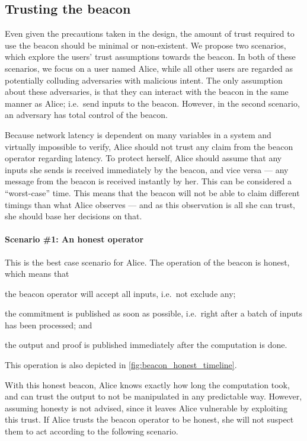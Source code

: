 \subsection{Trusting the beacon}%
\label{sub:trusting_the_beacon}

Even given the precautions taken in the design, the amount of trust required to use the beacon should be minimal or non-existent.
We propose two scenarios, which explore the users' trust assumptions towards the beacon.
In both of these scenarios, we focus on a user named Alice, while all other users are regarded as potentially colluding adversaries with malicious intent.
The only assumption about these adversaries, is that they can interact with the beacon in the same manner as Alice; i.e.\ send inputs to the beacon.
However, in the second scenario, an adversary has total control of the beacon.

Because network latency is dependent on many variables in a system and virtually impossible to verify, Alice should not trust any claim from the beacon operator regarding latency.
To protect herself, Alice should assume that any inputs she sends is received immediately by the beacon, and vice versa --- any message from the beacon is received instantly by her. This can be considered a \enquote{worst-case} time.
This means that the beacon will not be able to claim different timings than what Alice observes --- and as this observation is all she can trust, she should base her decisions on that.

\paragraph{Scenario \#1: An honest operator}
This is the best case scenario for Alice.
The operation of the beacon is honest, which means that
\begin{eletterate*}
\item the beacon operator will accept all inputs, i.e.\ not exclude any;
\item the commitment is published as soon as possible, i.e.\ right after a batch of inputs has been processed; and
\item the output and proof is published immediately after the computation is done.
\end{eletterate*}
This operation is also depicted in \cref{fig:beacon_honest_timeline}.

With this honest beacon, Alice knows exactly how long the computation took, and can trust the output to not be manipulated in any predictable way.
However, assuming honesty is not advised, since it leaves Alice vulnerable by exploiting this trust.
If Alice trusts the beacon operator to be honest, she will not suspect them to act according to the following scenario.

